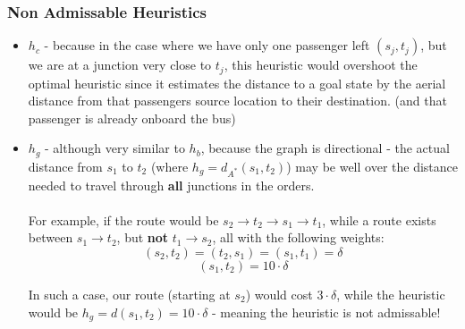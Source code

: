 \documentclass{article}
\begin{document}
\subsubsection*{Non Admissable Heuristics}
\begin{itemize}
\item $h_c$ - because in the case where we have only one passenger left $(s_j, t_j)$, but we are at a junction very close to $t_j$, this heuristic would overshoot the optimal heuristic since it estimates the distance to a goal state by the aerial distance from that passengers source location to their destination. (and that passenger is already onboard the bus)

\item $h_g$ - although very similar to $h_b$, because the graph is directional - the actual distance from $s_1$ to $t_2$ (where $h_g = d_{A^*}(s_1, t_2)$) may be well over the distance needed to travel through \textbf{all} junctions in the orders. \\~\\
For example, if the route would be $ s_2 \rightarrow t_2 \rightarrow s_1 \rightarrow t_1 $, while a route exists between $ s_1 \rightarrow t_2 $, but \textbf{not} $ t_1 \rightarrow s_2 $, all with the following weights:
$$
	(s_2, t_2) = (t_2, s_1) = (s_1, t_1) = \delta
$$
$$
	(s_1, t_2) = 10\cdot \delta
$$

In such a case, our route (starting at $s_2$) would cost $3\cdot \delta$, while the heuristic would be $h_g = d(s_1, t_2) = 10\cdot \delta$ - meaning the heuristic is not admissable!

\end{itemize}
\end{document}
